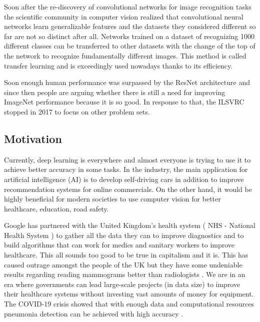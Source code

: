 \documentclass[a4paper,12pt]{article}
\begin{document}
\vspace{4mm}

\par Soon after the re-discovery of convolutional networks for image recognition tasks the scientific community in computer vision realized that convolutional neural networks learn generalizable features and the datasets they considered different so far are not so distinct after all. Networks trained on a dataset of recognizing 1000 different classes can be transferred to other datasets with the change of the top of the network to recognize fundamentally different images. This method is called transfer learning and is exceedingly used nowadays thanks to its efficiency.

\vspace{4mm}

\par Soon enough human performance was surpassed \cite{he2016deep} by the ResNet architecture and since then people are arguing whether there is still a need for improving ImageNet performance because it is so good. In response to that, the ILSVRC stopped in 2017 to focus on other problem sets. 

\vspace{7mm}

\subsection{Motivation}

\vspace{7mm}

Currently, deep learning is everywhere and almost everyone is trying to use it to achieve better accuracy in some tasks. In the industry, the main application for artificial intelligence (AI) is to develop self-driving cars in addition to improve recommendation systems for online commercials. On the other hand, it would be highly beneficial for modern societies to use computer vision for better healthcare, education, road safety.

\vspace{4mm}

\par Google has partnered with the United Kingdom's health system ( NHS - National Health System ) to gather all the data they can to improve diagnostics and to build algorithms that can work for medics and sanitary workers to improve healthcare. This all sounds too good to be true in capitalism and it is. This has caused outrage amongst the people of the UK \cite{kollewe_2019} but they have some undeniable results regarding reading mammograms better than radiologists \cite{mckinney2020international}. We are in an era where governments can lead large-scale projects (in data size) to improve their healthcare systems without investing vast amounts of money for equipment. The COVID-19 crisis showed that with enough data and computational resources pneumonia detection can be achieved with high accuracy \cite{nvidia}.
\end{document}
